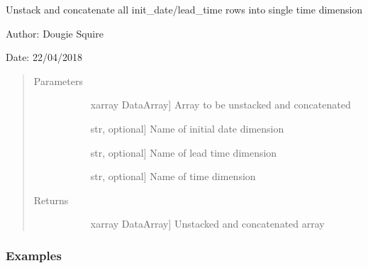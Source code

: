 \documentclass[letterpaper,10pt,english]{sphinxmanual}
\begin{document}

\begin{fulllineitems}
\label{\detokenize{utils_doc:utils.concat_times}}
Unstack and concatenate all init\_date/lead\_time rows into single time dimension

\begin{DUlineblock}{0em}
\item[] Author: Dougie Squire
\item[] Date: 22/04/2018
\end{DUlineblock}
\begin{quote}\begin{description}
\item[{Parameters}] \leavevmode\begin{description}
\item[{}] \leavevmode{[}xarray DataArray{]}
Array to be unstacked and concatenated

\item[{}] \leavevmode{[}str, optional{]}
Name of initial date dimension

\item[{}] \leavevmode{[}str, optional{]}
Name of lead time dimension

\item[{}] \leavevmode{[}str, optional{]}
Name of time dimension

\end{description}

\item[{Returns}] \leavevmode\begin{description}
\item[{}] \leavevmode{[}xarray DataArray{]}
Unstacked and concatenated array

\end{description}

\end{description}\end{quote}
\subsubsection*{Examples}


\end{fulllineitems}
\end{document}
